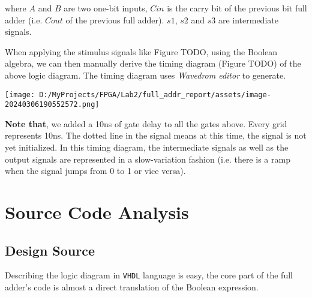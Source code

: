 \documentclass[
]{article}
\begin{document}
where \(A\) and \(B\) are two one-bit inputs, \(Cin\) is the carry bit
of the previous bit full adder (i.e. \(Cout\) of the previous full
adder). \(s1\), \(s2\) and \(s3\) are intermediate signals.

When applying the stimulus signals like Figure TODO, using the Boolean
algebra, we can then manually derive the timing diagram (Figure TODO) of
the above logic diagram. The timing diagram uses \emph{Wavedrom editor}
to generate.

\texttt{[image: D:/MyProjects/FPGA/Lab2/full\_addr\_report/assets/image-20240306190552572.png]}



\textbf{Note that}, we added a 10ns of gate delay to all the gates
above. Every grid represents 10ns. The dotted line in the signal means
at this time, the signal is not yet initialized. In this timing diagram,
the intermediate signals as well as the output signals are represented
in a slow-variation fashion (i.e. there is a ramp when the signal jumps
from 0 to 1 or vice versa).

\hypertarget{source-code-analysis}{%
\section{Source Code Analysis}\label{source-code-analysis}}

\hypertarget{design-source}{%
\subsection{Design Source}\label{design-source}}

Describing the logic diagram in \texttt{VHDL} language is easy, the core
part of the full adder's code is almost a direct translation of the
Boolean expression.
\end{document}
